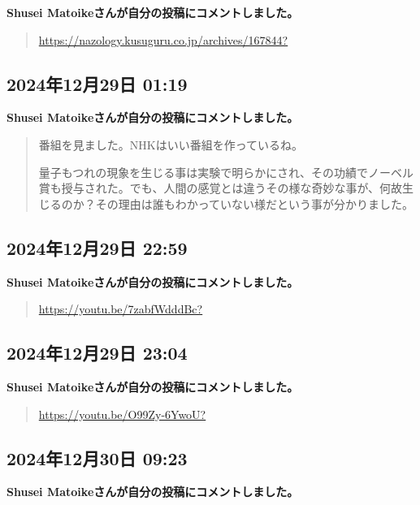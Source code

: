 \textbf{Shusei Matoikeさんが自分の投稿にコメントしました。}

\begin{quote}
\url{https://nazology.kusuguru.co.jp/archives/167844?}
\end{quote}

\subsection*{2024年12月29日 01:19}

\textbf{Shusei Matoikeさんが自分の投稿にコメントしました。}

\begin{quote}
番組を見ました。NHKはいい番組を作っているね。

量子もつれの現象を生じる事は実験で明らかにされ、その功績でノーベル賞も授与された。でも、人間の感覚とは違うその様な奇妙な事が、何故生じるのか？その理由は誰もわかっていない様だという事が分かりました。
\end{quote}

\subsection*{2024年12月29日 22:59}

\textbf{Shusei Matoikeさんが自分の投稿にコメントしました。}

\begin{quote}
\url{https://youtu.be/7zabfWdddBc?}
\end{quote}

\subsection*{2024年12月29日 23:04}

\textbf{Shusei Matoikeさんが自分の投稿にコメントしました。}

\begin{quote}
\url{https://youtu.be/O99Zy-6YwoU?}
\end{quote}

\subsection*{2024年12月30日 09:23}

\textbf{Shusei Matoikeさんが自分の投稿にコメントしました。}

